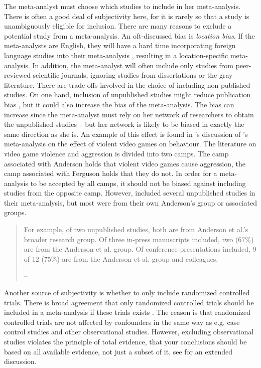 The meta-analyst must choose which studies to include in her meta-analysis. There is often a good deal of subjectivity here, for it is rarely so that a study is unambiguously eligible for inclusion. There are many reasons to exclude a potential study from a meta-analysis. An oft-discussed bias is \emph{location bias}. If the meta-analysts are English, they will have a hard time incorporating foreign language studies into their meta-analysis \parencite{Egger1998-kj}, resulting in a location-specific meta-analysis. In addition, the meta-analyst will often include only studies from peer-reviewed scientific journals, ignoring studies from dissertations or the gray literature. There are trade-offs involved in the choice of including non-published studies. On one hand, inclusion of unpublished studies might reduce publication bias \parencite{Egger1997-ue}, but it could also increase the bias of the meta-analysis. The bias can increase since the meta-analyst must rely on her network of researchers to obtain the unpublished studies -- but her network is likely to be biased in exactly the same direction as she is. An example of this effect is found in \textcite{Ferguson2010-to}'s discussion of \textcite{Anderson2010-ki}'s meta-analysis on the effect of violent video games on behaviour. The literature on video game violence and aggression is divided into two camps. The camp associated with Anderson holds that violent video games cause aggression, the camp associated with Ferguson holds that they do not. In order for a meta-analysis to be accepted by all camps, it should not be biased against including studies from the opposite camp. However, \textcite{Anderson2010-ki} included several unpublished studies in their meta-analysis, but most were from their own Anderson's group or associated groups.
\begin{quote}
For example, of two unpublished studies, both are from Anderson et
al.'s broader research group. Of three in-press manuscripts
included, two (67\%) are from the Anderson et al. group. Of conference
presentations included, 9 of 12 (75\%) are from the Anderson et al.
group and colleagues. 
\begin{flushright}
-- \textcite[p. 2]{Ferguson2010-to}
\par\end{flushright}
\end{quote}
Another source of subjectivity is whether to only include randomized controlled trials. There is broad agreement that only randomized controlled trials should be included in a meta-analysis if these trials exists \parencite{Egger1997-ue}. The reason is that randomized controlled trials are not affected by confounders in the same way as e.g. case control studies and other observational studies. However, excluding observational studies violates the principle of total evidence, that your conclusions should be based on all available evidence, not just a subset of it, see \textcite{Stegenga2011-zo} for an extended discussion.

